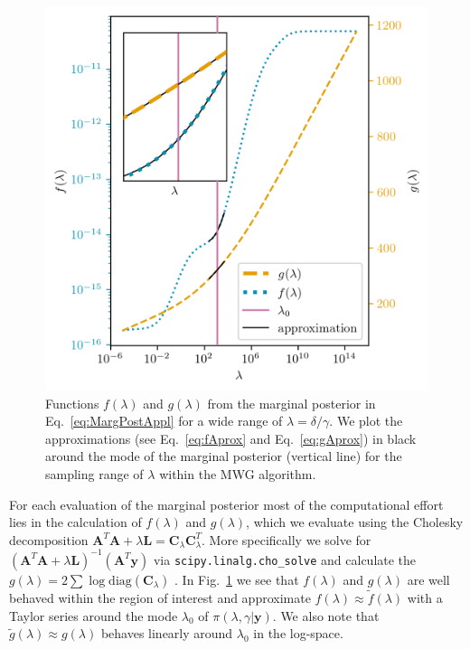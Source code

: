\begin{figure}[th!]
	\centering
	\includegraphics{f_and_g_phd.png}
	\caption[Functions $f(\lambda)$ and $g(\lambda)$ of 2D marginal posterior.]{Functions $f(\lambda)$ and $g(\lambda)$ from the marginal posterior in Eq.~\ref{eq:MargPostAppl} for a wide range of $\lambda = \delta / \gamma$. We plot the approximations (see Eq.~\ref{eq:fAprox} and Eq.~\ref{eq:gAprox}) in black around the mode of the marginal posterior (vertical line) for the sampling range of $\lambda$ within the MWG algorithm.}
	\label{fig:fandg}
\end{figure}
For each evaluation of the marginal posterior most of the computational effort lies in the calculation of $f(\lambda)$ and $g(\lambda)$, which we evaluate using the Cholesky decomposition $\bm{A}^T  \bm{A} + \lambda \bm{L} = \bm{C}_{\lambda} \bm{C}_{\lambda}^T$.
More specifically we solve for $(\bm{A}^T  \bm{A} + \lambda \bm{L})^{-1} (\bm{A}^T \bm{y})$ via \texttt{scipy.linalg.cho\_solve} and calculate the $g(\lambda) = 2 \sum \log \text{diag}(\bm{C}_{\lambda}) $ .
In  Fig.~\ref{fig:fandg} we see that $f(\lambda)$ and $g(\lambda)$ are well behaved within the region of interest and approximate $f(\lambda) \approx \tilde{f}(\lambda)$ with a Taylor series around the mode $\lambda_0$ of $\pi(\lambda, \gamma | \bm{y})$.
We also note that $\tilde{g}(\lambda) \approx g(\lambda)$ behaves linearly around $\lambda_0$ in the log-space.
